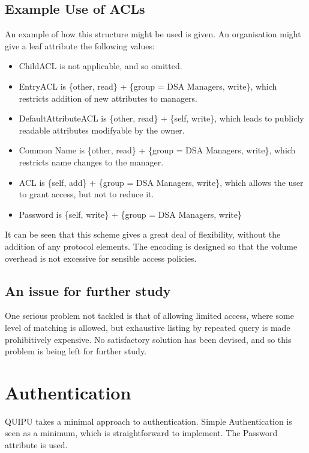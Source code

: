 \subsection {Example Use of ACLs}

An example of how this structure might be used is given.
An organisation might give a leaf attribute the following values:

\begin {itemize}
\item
ChildACL is not applicable, and so omitted.
\item
EntryACL is \{other, read\} + \{group = DSA Managers, write\}, which
restricts addition of new attributes to managers.
\item
DefaultAttributeACL is \{other, read\} + \{self, write\}, which leads to
publicly readable attributes modifyable by the owner.
\item
Common Name is
\{other, read\} + \{group = DSA Managers, write\}, which restricts name
changes to the manager.
\item
ACL is \{self, add\} + \{group = DSA Managers, write\}, which allows the
user to grant access, but not to reduce it.
\item
Password is \{self, write\} + \{group = DSA Managers, write\}
\end {itemize}

It can be seen that this scheme gives a great deal of flexibility,
without the addition of any protocol elements.
The encoding is designed so that the volume overhead is not excessive
for sensible access policies.

\subsection {An issue for further study}

One serious problem not tackled is that of allowing limited access, where
some level of matching is allowed, but exhaustive listing by repeated query
is made prohibitively expensive.  No satisfactory solution has been devised,
and so this problem is being left for further study.



\section {Authentication}

QUIPU takes a minimal approach to authentication.
Simple Authentication is seen as a minimum, which is straightforward to
implement.
The Password attribute is used.

